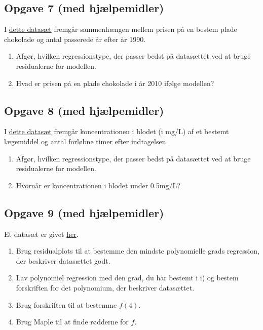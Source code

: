 \subsection*{Opgave 7 (med hjælpemidler)}

I \href{https://github.com/ChristianJLex/TeachingNotes/raw/master/2023-2024/Data og lign/Chokoladepris.xlsx}{\color{blue!60} dette datasæt} fremgår sammenhængen mellem prisen på en bestem plade chokolade og antal passerede år efter år 1990.

\begin{enumerate}[label=\roman*)]
	\item Afgør, hvilken regressionstype, der passer bedst på datasættet ved at bruge 
	residualerne for modellen.
	\item Hvad er prisen på en plade chokolade i år 2010 ifølge modellen?
\end{enumerate}

\subsection*{Opgave 8 (med hjælpemidler)}

I \href{https://github.com/ChristianJLex/TeachingNotes/raw/master/2023-2024/Data og lign/Laegemiddel.xlsx}{\color{blue!60} dette datasæt} fremgår koncentrationen i blodet (i mg/L) af et bestemt lægemiddel og antal forløbne timer efter indtagelsen.

\begin{enumerate}[label=\roman*)]
	\item Afgør, hvilken regressionstype, der passer bedst på datasættet ved at bruge 
	residualerne for modellen.
	\item Hvornår er koncentrationen i blodet under 0.5mg/L?
\end{enumerate}

\subsection*{Opgave 9 (med hjælpemidler)}
	Et datasæt er givet \href{https://github.com/ChristianJLex/TeachingNotes/raw/master/2023-2024/Data og lign/poly_opgave1.xlsx}{\color{blue!60} her}.
	\begin{enumerate}[label=\roman*)]
		\item Brug residualplots til at bestemme den mindste polynomielle grads regression, 
		der beskriver datasættet godt. 
		\item Lav polynomiel regression med den grad, du har bestemt i i) og bestem 
		forskriften for det polynomium, der beskriver datasættet.
		\item Brug forskriften til at bestemme $f(4)$.
		\item Brug Maple til at finde rødderne for $f$.
	\end{enumerate}
